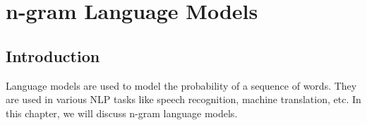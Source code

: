 \chapter{n-gram Language Models}

\section{Introduction}
Language models are used to model the probability of a sequence of words. They are used in various NLP tasks like speech recognition, machine translation, etc. In this chapter, we will discuss n-gram language models.